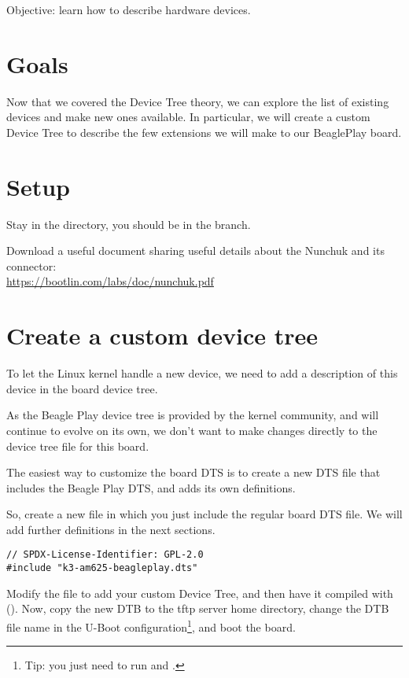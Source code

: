 {Objective: learn how to describe hardware devices.}

\section{Goals}

Now that we covered the Device Tree theory, we can explore the list of
existing devices and make new ones available. In particular, we will
create a custom Device Tree to describe the few extensions we will make
to our BeaglePlay board.

\section{Setup}

Stay in the  directory, you should be in
the  branch.

Download a useful document sharing useful details about the Nunchuk
and its connector:\\
\url{https://bootlin.com/labs/doc/nunchuk.pdf}

\section{Create a custom device tree}

To let the Linux kernel handle a new device, we need to add a
description of this device in the board device tree.

As the Beagle Play device tree is provided by the kernel community,
and will continue to evolve on its own, we don't want to make changes
directly to the device tree file for this board.

The easiest way to customize the board DTS is to create a new DTS file
that includes the Beagle Play DTS, and adds its own definitions.

So, create a new
 file in which
you just include the regular board DTS file. We will add further
definitions in the next sections.

\begin{verbatim}
// SPDX-License-Identifier: GPL-2.0
#include "k3-am625-beagleplay.dts"
\end{verbatim}

Modify the  file to add your custom
Device Tree, and then have it compiled with (). Now,
copy the new DTB to the tftp server home directory, change the DTB file
name in the U-Boot configuration\footnote{Tip: you just need to run
 and .}, and boot the board.

